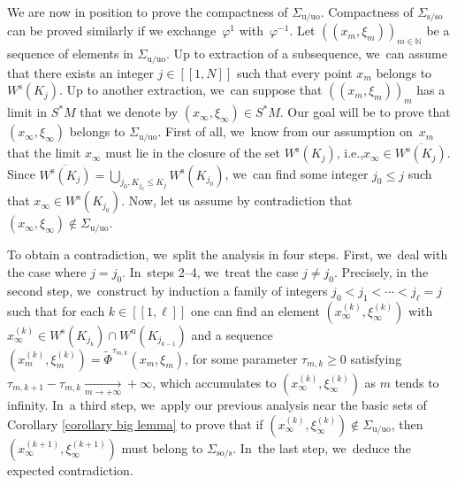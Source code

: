 \documentclass[11pt]{article}
\newcommand{\ie}{i.e.,\xspace}
\newcommand{\lcr}{[\![}
\newcommand{\rcr}{]\!]}
\newcommand{\rs}{\mathrm{s}}
\newcommand{\rso}{\mathrm{so}}
\newcommand{\ru}{\mathrm{u}}
\newcommand{\ruo}{\mathrm{uo}}
\theoremstyle{definition}
\theoremstyle{plain}
\newcommand{\N}{\mathbb{N}}
\begin{document}
We are now in position to prove the compactness of $\Sigma_{\ru/\ruo}$. Compactness of $\Sigma_{\rs/\rso}$ can be proved similarly if we exchange~$\varphi^1$ with~$\varphi^{-1}$. Let $((x_m, \xi_m))_{m \in \N}$ be a sequence of elements in $\Sigma_{\ru/\ruo}$. Up to extraction of a subsequence, we~can assume that there exists an integer $j\in\lcr1,N\rcr$ such that every point $x_m$ belongs to $W^\rs (K_j)$. Up to another extraction, we~can suppose that $((x_m,\xi_m))_m$ has a limit in $S^*M$ that we denote by $(x_{\infty},\xi_{\infty}) \in S^*M$. Our goal will be to prove that $(x_{\infty}, \xi_{\infty})$ belongs to $\Sigma_{\ru/\ruo}$. First of all, we~know from our assumption on~$x_m$ that the limit $x_{\infty}$ must lie in the closure of the set $ W^\rs (K_j)$, \ie $x_{\infty} \in \overline{W^\rs (K_j)}$. Since $\overline{W^\rs (K_j)} = \bigcup_{j_0, K_{j_0} \leq K_j} W^\rs (K_{j_0})$, we~can find some integer $j_0 \leq j$ such that $x_{\infty} \in W^\rs (K_{j_0})$. Now, let us assume by contradiction that $(x_{\infty},\xi_{\infty}) \notin \Sigma_{\ru/\ruo}$.

To obtain a contradiction, we~split the analysis in four steps. First, we~deal with the case where $j = j_0$. In~steps 2--4, we~treat the case $j \neq j_0$. Precisely, in the second step, we~construct by induction a family of integers $j_0 < j_1 < \cdots < j_{\ell} = j$ such that for each $k\in\lcr1,\ell\rcr$ one can find an element $(x_{\infty}^{(k)}, \xi_{\infty}^{(k)})$ with $x_{\infty}^{(k)} \in W^\rs (K_{j_k}) \cap W^\ru (K_{j_{k-1}})$ and a sequence $(x_m^{(k)},\xi_m^{(k)}) = \widetilde{\Phi}^{\tau_{m,k}} (x_m,\xi_m)$, for some parameter $ \tau_{m,k} \geq 0$ satisfying $\tau_{m,k +1} - \tau_{m,k} \underset{m\to+\infty}{\to} + \infty$, which accumulates to $(x_{\infty}^{(k)},\xi_{\infty}^{(k)})$ as $m$ tends to infinity. In~a third step, we~apply our previous analysis near the basic sets of Corollary \ref{corollary big lemma} to prove that if $(x_{\infty}^{(k)},\xi_{\infty}^{(k)}) \notin \Sigma_{\ru/\ruo}$, then $(x_{\infty}^{(k+1)}, \xi_{\infty}^{(k+1)})$ must belong to $\Sigma_{\rso/\rs}$. In~the last step, we~deduce the expected contradiction.
\end{document}
